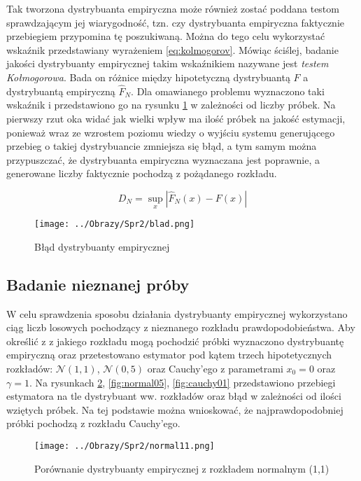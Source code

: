 \documentclass[12pt,a4paper]{article}
\begin{document}
Tak tworzona dystrybuanta empiryczna może również zostać poddana testom sprawdzającym jej wiarygodność, tzn. czy dystrybuanta empiryczna faktycznie przebiegiem przypomina tę poszukiwaną.
Można do tego celu wykorzystać wskaźnik przedstawiany wyrażeniem \ref{eq:kolmogorov}.
Mówiąc ściślej, badanie jakości dystrybuanty empirycznej takim wskaźnikiem nazywane jest \textit{testem Kołmogorowa}.
Bada on różnice między hipotetyczną dystrybuantą $F$ a dystrybuantą empiryczną $\hat{F}_{N}$.
Dla omawianego problemu wyznaczono taki wskaźnik i przedstawiono go na rysunku \ref{fig:bladDystrybuanty} w zależności od liczby próbek.
Na pierwszy rzut oka widać jak wielki wpływ ma ilość próbek na jakość estymacji, ponieważ wraz ze wzrostem poziomu wiedzy o wyjściu systemu generującego przebieg o takiej dystrybuancie zmniejsza się błąd, a tym samym można przypuszczać, że dystrybuanta empiryczna wyznaczana jest poprawnie, a generowane liczby faktycznie pochodzą z pożądanego rozkładu.


\begin{equation}\label{eq:kolmogorov}
D_{N}=\sup_{x}|\hat{F}_{N}(x)-F(x)|
\end{equation}

\begin{figure}[H]
\centering
\texttt{[image: ../Obrazy/Spr2/blad.png]} 
\caption{Błąd dystrybuanty empirycznej}
\label{fig:bladDystrybuanty}
\end{figure}

\subsection{Badanie nieznanej próby}
W celu sprawdzenia sposobu działania dystrybuanty empirycznej wykorzystano ciąg liczb losowych pochodzący z nieznanego rozkładu prawdopodobieństwa.
Aby określić z z jakiego rozkładu mogą pochodzić próbki wyznaczono dystrybuantę empiryczną oraz przetestowano estymator pod kątem trzech hipotetycznych rozkładów: $\mathcal{N}(1,1)$, $\mathcal{N}(0,5)$ oraz Cauchy'ego z parametrami $x_{0}=0$ oraz $\gamma=1$.
Na rysunkach \ref{fig:normal11}, \ref{fig:normal05}, \ref{fig:cauchy01} przedstawiono przebiegi estymatora na tle dystrybuant ww. rozkładów oraz błąd w zależności od ilości wziętych próbek.
Na tej podstawie można wnioskować, że najprawdopodobniej próbki pochodzą z rozkładu Cauchy'ego.

\begin{figure}[H]
\centering
\texttt{[image: ../Obrazy/Spr2/normal11.png]} 
\caption{Porównanie dystrybuanty empirycznej z rozkładem normalnym (1,1)}
\label{fig:normal11}
\end{figure}
\end{document}
